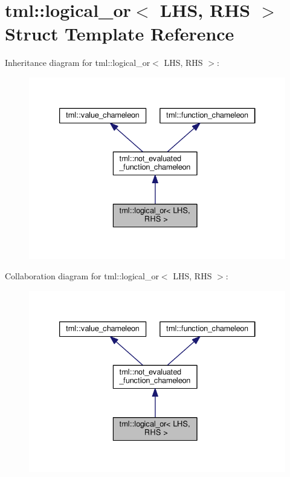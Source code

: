 \hypertarget{structtml_1_1logical__or}{\section{tml\+:\+:logical\+\_\+or$<$ L\+H\+S, R\+H\+S $>$ Struct Template Reference}
\label{structtml_1_1logical__or}
}


Inheritance diagram for tml\+:\+:logical\+\_\+or$<$ L\+H\+S, R\+H\+S $>$\+:
\nopagebreak
\begin{figure}[H]
\begin{center}
\leavevmode
\includegraphics[width=333pt]{structtml_1_1logical__or__inherit__graph}
\end{center}
\end{figure}


Collaboration diagram for tml\+:\+:logical\+\_\+or$<$ L\+H\+S, R\+H\+S $>$\+:
\nopagebreak
\begin{figure}[H]
\begin{center}
\leavevmode
\includegraphics[width=333pt]{structtml_1_1logical__or__coll__graph}
\end{center}
\end{figure}
